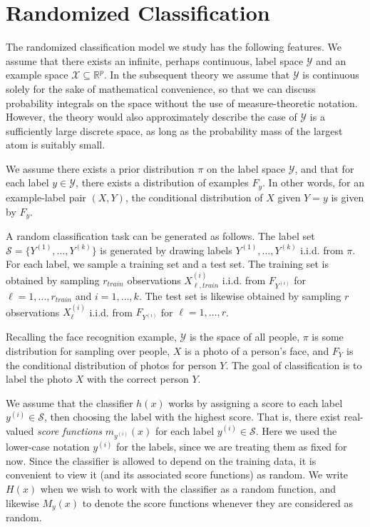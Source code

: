 \documentclass[twoside,11pt]{article}
\begin{document}
\section{Randomized Classification}\label{sec:rc_motivation}

The randomized classification model we study has the following
features.  We assume that there exists an infinite, perhaps
continuous, label space $\mathcal{Y}$ and an example space $\mathcal{X}
\subseteq \mathbb{R}^p$.
In the subsequent theory we assume that $\mathcal{Y}$ is continuous
solely for the sake of mathematical convenience, so that we can
discuss probability integrals on the space without the use of measure-theoretic notation.
However, the theory would also approximately describe the case of
$\mathcal{Y}$ is a sufficiently large discrete space,
as long as the probability mass of the largest atom is suitably small. %

We assume there exists a prior distribution $\pi$
on the label space $\mathcal{Y}$,  and that for each label $y \in
\mathcal{Y}$, there exists a distribution of examples $F_y$. In other
words, for an example-label pair $(X, Y)$, the conditional
distribution of $X$ given $Y = y$ is given by $F_y$.

A random classification task can be generated as follows.  The label
set $\mathcal{S} = \{Y^{(1)},\hdots, Y^{(k)}\}$ is generated by
drawing labels $Y^{(1)},\hdots, Y^{(k)}$ i.i.d. from $\pi$.  For each
label, we sample a training set and a test set.  The training set is
obtained by sampling $r_{train}$ observations $X_{\ell, train}^{(i)}$
i.i.d. from $F_{Y^{(i)}}$ for $\ell = 1,\hdots, r_{train}$ and $i =
1,\hdots, k$.  The test set is likewise obtained by sampling $r$
observations $X_\ell^{(i)}$ i.i.d. from $F_{Y^{(i)}}$ for $\ell = 1,\hdots,
r$.

Recalling the face recognition example, 
$\mathcal{Y}$ is the space of all people,
$\pi$ is some distribution for sampling over people,
$X$ is a photo of a person's face, and
$F_Y$ is the conditional distribution of photos for person $Y$.
The goal of classification is to label the photo $X$ with the correct person $Y$.

We assume that the classifier $h(x)$ works by assigning a score to
each label $y^{(i)} \in \mathcal{S}$, then choosing the label with the
highest score.  That is, there exist real-valued \emph{score
  functions} $m_{y^{(i)}}(x)$ for each label $y^{(i)} \in
\mathcal{S}$.  
Here we used the lower-case notation $y^{(i)}$ for the labels,
since we are treating them as fixed for now. %
Since the classifier is allowed to depend on the
training data, it is convenient to view it (and its associated score
functions) as random.  We write $H(x)$ when we wish to work with the
classifier as a random function, and likewise $M_y(x)$ to denote the
score functions whenever they are considered as random.
\end{document}

